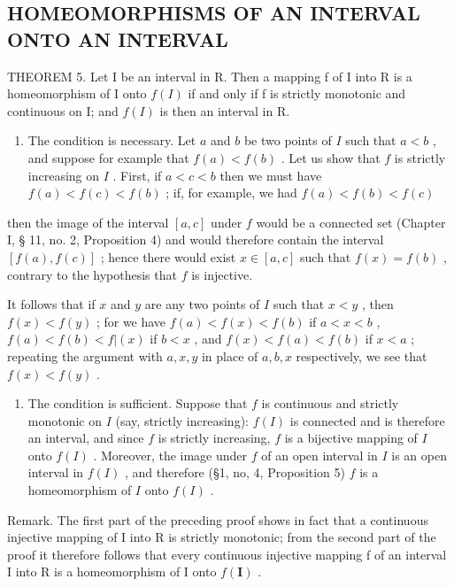 \subsection{HOMEOMORPHISMS OF AN INTERVAL ONTO AN INTERVAL}

THEOREM 5. Let I be an interval in R. Then a mapping f of I into R is a homeomorphism of I onto \(f(I)\) if and only if f is strictly monotonic and continuous on I; and \(f(I)\) is then an interval in R.

\begin{enumerate}
\def\labelenumi{\arabic{enumi})}
\tightlist
\item
  The condition is necessary. Let \(a\) and \(b\) be two points of \(I\) such that \(a < b\) , and suppose for example that \(f(a) < f(b)\) . Let us show that \(f\) is strictly increasing on \(I\) . First, if \(a < c < b\) then we must have \(f(a) < f(c) < f(b)\) ; if, for example, we had \(f(a) < f(b) < f(c)\)
\end{enumerate}

then the image of the interval \([a, c]\) under \(f\) would be a connected set (Chapter I, § 11, no. 2, Proposition 4) and would therefore contain the interval \([f(a), f(c)]\) ; hence there would exist \(x \in [a, c]\) such that \(f(x) = f(b)\) , contrary to the hypothesis that \(f\) is injective.

It follows that if \(x\) and \(y\) are any two points of \(I\) such that \(x < y\) , then \(f(x) < f(y)\) ; for we have \(f(a) < f(x) < f(b)\) if \(a < x < b\) , \(f(a) < f(b) < f|(x)\) if \(b < x\) , and \(f(x) < f(a) < f(b)\) if \(x < a\) ; repeating the argument with \(a, x, y\) in place of \(a, b, x\) respectively, we see that \(f(x) < f(y)\) .

\begin{enumerate}
\def\labelenumi{\arabic{enumi})}
\setcounter{enumi}{1}
\tightlist
\item
  The condition is sufficient. Suppose that \(f\) is continuous and strictly monotonic on \(I\) (say, strictly increasing): \(f(I)\) is connected and is therefore an interval, and since \(f\) is strictly increasing, \(f\) is a bijective mapping of \(I\) onto \(f(I)\) . Moreover, the image under \(f\) of an open interval in \(I\) is an open interval in \(f(I)\) , and therefore (§1, no, 4, Proposition 5) \(f\) is a homeomorphism of \(I\) onto \(f(I)\) .
\end{enumerate}

Remark. The first part of the preceding proof shows in fact that a continuous injective mapping of I into R is strictly monotonic; from the second part of the proof it therefore follows that every continuous injective mapping f of an interval I into R is a homeomorphism of I onto \(f(\mathbf{I})\) .

